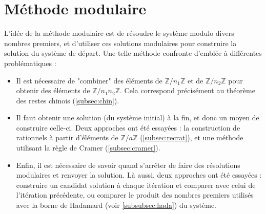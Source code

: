 \documentclass[french]{article}
\begin{document}
\section{Méthode modulaire} \label{sec:modulaire}
L'idée de la méthode modulaire est de résoudre le système modulo divers nombres premiers, et d'utiliser ces solutions modulaires pour construire la solution du système de départ. Une telle méthode confronte d'emblée à différentes problématiques :
\begin{itemize}
	\item Il est nécessaire de "combiner" des éléments de $\mathbb{Z}/n_1\mathbb{Z}$ et de $\mathbb{Z}/n_2\mathbb{Z}$ pour obtenir des éléments de $\mathbb{Z}/n_1n_2\mathbb{Z}$. Cela correspond précisément au théorème des restes chinois (\ref{subsec:chin}).
	\item Il faut obtenir une solution (du système initial) à la fin, et donc un moyen de construire celle-ci. Deux approches ont été essayées : la construction de rationnels à partir d'éléments de $\mathbb{Z}/a\mathbb{Z}$ (\ref{subsec:recrat}), et une méthode utilisant la règle de Cramer (\ref{subsec:cramer}).
	\item Enfin, il est nécessaire de savoir quand s'arrêter de faire des résolutions modulaires et renvoyer la solution. Là aussi, deux approches ont été essayées : construire un candidat solution à chaque itération et comparer avec celui de l'itération précédente, ou comparer le produit des nombres premiers utilisés avec la borne de Hadamard (voir \ref{subsubsec:hada}) du système.
\end{itemize}
\end{document}

